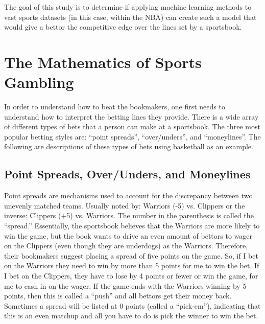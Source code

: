 \documentclass [MS] {uclathes}
\begin{document}
\noindent The goal of this study is to determine if applying machine learning methods to vast sports datasets (in this case, within the NBA) can create such a model that would give a bettor the competitive edge over the lines set by a sportsbook. \\


\chapter{The Mathematics of Sports Gambling}

\noindent In order to understand how to beat the bookmakers, one first needs to understand how to interpret the betting lines they provide. There is a wide array of different types of bets that a person can make at a sportsbook. The three most popular betting styles are: ``point spreads'', ``over/unders'', and ``moneylines''. The following are descriptions of these types of bets using basketball as an example.\\

\section{Point Spreads, Over/Unders, and Moneylines}
Point spreads are mechanisms used to account for the discrepancy between two unevenly matched teams. Usually noted by: Warriors (-5) vs. Clippers or the inverse: Clippers (+5) vs. Warriors. The number in the parenthesis is called the ``spread.'' Essentially, the sportsbook believes that the Warriors are more likely to win the game, but the book wants to drive an even amount of bettors to wager on the Clippers (even though they are underdogs) as the Warriors. Therefore, their bookmakers suggest placing a spread of five points on the game. So, if I bet on the Warriors they need to win by more than 5 points for me to win the bet. If I bet on the Clippers, they have to lose by 4 points or fewer or win the game, for me to cash in on the wager. If the game ends with the Warriors winning by 5 points, then this is called a ``push'' and all bettors get their money back. Sometimes a spread will be listed at 0 points (called a ``pick-em''), indicating that this is an even matchup and all you have to do is pick the winner to win the bet.\\
\end{document}
